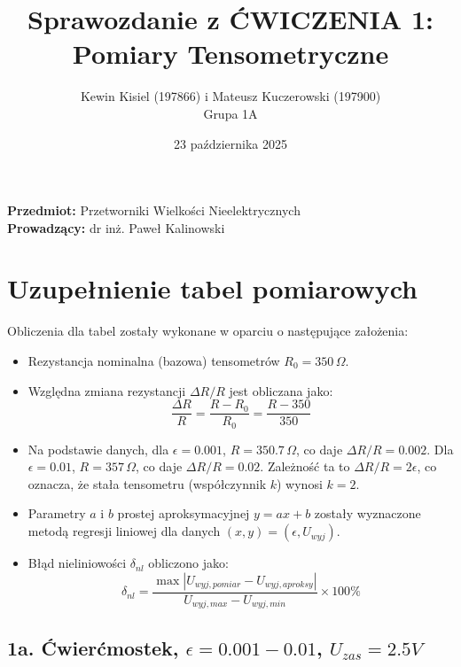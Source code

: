 \documentclass[12pt, a4paper]{article}
\title{Sprawozdanie z ĆWICZENIA 1: Pomiary Tensometryczne}
\author{Kewin Kisiel (197866) i Mateusz Kuczerowski (197900) \\ Grupa 1A}
\date{23 października 2025}
\begin{document}
	
	\maketitle
	\noindent \textbf{Przedmiot:} Przetworniki Wielkości Nieelektrycznych \\
	\textbf{Prowadzący:} dr inż. Paweł Kalinowski \\
	\hrulefill
	
	\section{Uzupełnienie tabel pomiarowych}
	
	Obliczenia dla tabel zostały wykonane w oparciu o następujące założenia:
	\begin{itemize}
		\item Rezystancja nominalna (bazowa) tensometrów $R_0 = 350 \, \Omega$.
		\item Względna zmiana rezystancji $\Delta R / R$ jest obliczana jako:
		$$ \frac{\Delta R}{R} = \frac{R - R_0}{R_0} = \frac{R - 350}{350} $$
		\item Na podstawie danych, dla $\epsilon = 0.001$, $R = 350.7 \, \Omega$, co daje $\Delta R/R = 0.002$. Dla $\epsilon = 0.01$, $R = 357 \, \Omega$, co daje $\Delta R/R = 0.02$. Zależność ta to $\Delta R/R = 2\epsilon$, co oznacza, że stała tensometru (współczynnik $k$) wynosi \textbf{$k=2$}.
		\item Parametry $a$ i $b$ prostej aproksymacyjnej $y = ax + b$ zostały wyznaczone metodą regresji liniowej dla danych $(x, y) = (\epsilon, U_{wyj})$.
		\item Błąd nieliniowości $\delta_{nl}$ obliczono jako:
		$$ \delta_{nl} = \frac{\max|U_{wyj, pomiar} - U_{wyj, aproksy}|}{U_{wyj, max} - U_{wyj, min}} \times 100\% $$
	\end{itemize}
	
	\subsection{1a. Ćwierćmostek, $\epsilon = 0.001-0.01$, $U_{zas} = 2.5 V$}
	
\end{document}

